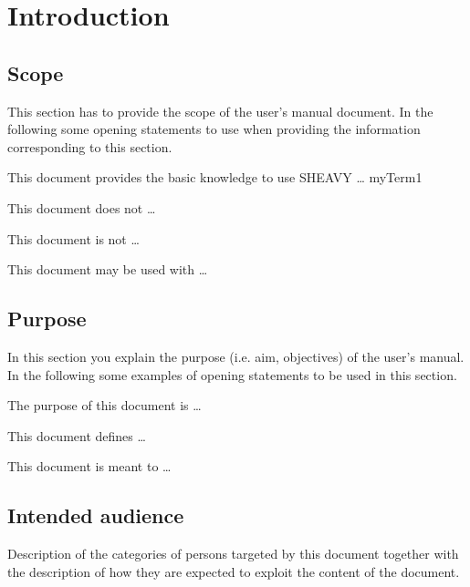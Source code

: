 \chapter{Introduction}
\usepackage{glossaries}
\makeglossaries
{}
\label{chap:introduction}

\section{Scope}
This section has to provide the scope of the user's manual document.
In the following some opening statements to use when providing the
information corresponding to this section.

This document provides the basic knowledge to use SHEAVY \ldots
\gls{myTerm1} 

This document does not \ldots 
 
This document is not \ldots

 
This document may be used with \ldots




\section{Purpose}
In this section you explain the purpose (i.e. aim, objectives) of the user's
manual. In the following some examples of opening statements to be used in this
section.

The purpose of this document is \ldots

This document defines \ldots

This document is meant to \ldots



\section{Intended audience}
Description of the categories of persons targeted by this document together with the description of how they are expected to exploit the content of the document.


